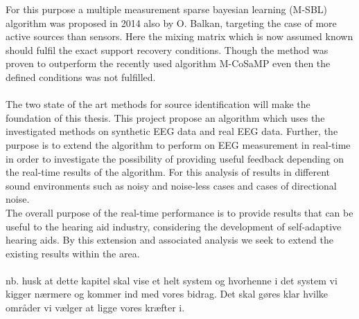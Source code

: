 For this purpose a multiple measurement sparse
bayesian learning (M-SBL) algorithm was proposed in 2014 also by O. Balkan, targeting the case of more active sources than sensors\cite{Balkan2014}. Here the mixing matrix which is now assumed known should fulfil the exact support recovery conditions. Though the method was proven to outperform the recently used algorithm M-CoSaMP even then the defined conditions was not fulfilled.  \\   
\\
The two state of the art methods for source identification will make the foundation of this thesis. This project propose an algorithm which uses the investigated methods on synthetic EEG data and real EEG data.
Further, the purpose is to extend the algorithm to perform on EEG measurement in real-time in order to investigate the possibility of providing useful feedback depending on the real-time results of the algorithm. 
For this analysis of results in different sound environments such as noisy and noise-less cases and cases of directional noise.\\
The overall purpose of the real-time performance is to provide results that can be useful to the hearing aid industry, considering the development of self-adaptive hearing aids.
By this extension and associated analysis we seek to extend the existing results within the area.   
\\ \\


nb. husk at dette kapitel skal vise et helt system og hvorhenne i det system vi kigger nærmere og kommer ind med vores bidrag. Det skal gøres klar hvilke områder vi vælger at ligge vores kræfter i.  





 
